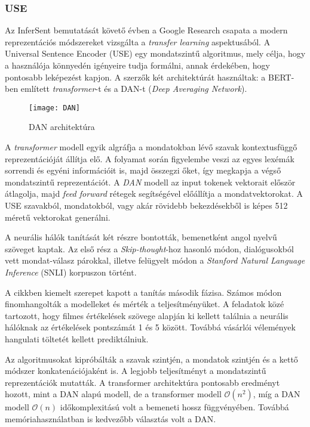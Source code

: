 \subsubsection{USE}
Az InferSent bemutatását követő évben a Google Research csapata a modern reprezentációs módszereket vizsgálta a \textit{transfer learning} aspektusából. A Universal Sentence Encoder (USE) \cite{use} egy mondatszintű  algoritmus, mely célja, hogy a használója könnyedén igényeire tudja formálni, annak érdekében, hogy pontosabb leképezést kapjon. A szerzők két architektúrát használtak: a BERT-ben említett \textit{transformer}-t és a DAN-t (\textit{Deep Averaging Network}). 

\begin{figure}[H]
	\centering
	\texttt{[image: DAN]}
	\caption{DAN architektúra}
\end{figure}

A \textit{transformer} modell egyik algráfja a mondatokban lévő szavak kontextusfüggő reprezentációját állítja elő. A folyamat során figyelembe veszi az egyes lexémák sorrendi és egyéni információit is, majd összegzi őket, így megkapja a végső mondatszintű reprezentációt.
A \textit{DAN} modell az input tokenek vektorait először átlagolja, majd \textit{feed forward} rétegek segítségével előállítja a mondatvektorokat. A USE szavakból, mondatokból, vagy akár rövidebb bekezdésekből is képes 512 méretű vektorokat generálni.

A neurális hálók tanítását két részre bontották, bemenetként angol nyelvű szöveget kaptak. Az első rész a \textit{Skip-thought}-hoz hasonló módon, dialógusokból vett mondat-válasz párokkal, illetve felügyelt módon a \textit{Stanford Natural Language Inference} (SNLI) korpuszon történt.

A cikkben kiemelt szerepet kapott a tanítás második fázisa. Számos módon finomhangolták a modelleket és mérték a teljesítményüket. A feladatok közé tartozott, hogy filmes értékelések szövege alapján ki kellett találnia a neurális hálóknak az értékelések pontszámát 1 és 5 között. Továbbá vásárlói vélemények hangulati töltetét kellett prediktálniuk.

Az algoritmusokat kipróbálták a szavak szintjén, a mondatok szintjén és a kettő módszer konkatenációjaként is. A legjobb teljesítményt a mondatszintű reprezentációk mutatták. A transformer architektúra pontosabb eredményt hozott, mint a DAN alapú modell, de a transformer modell $\mathcal{O}(n^2)$, míg a DAN modell $\mathcal{O}(n)$ időkomplexitású volt a bemeneti hossz függvényében. Továbbá memóriahasználatban is kedvezőbb választás volt a DAN.

